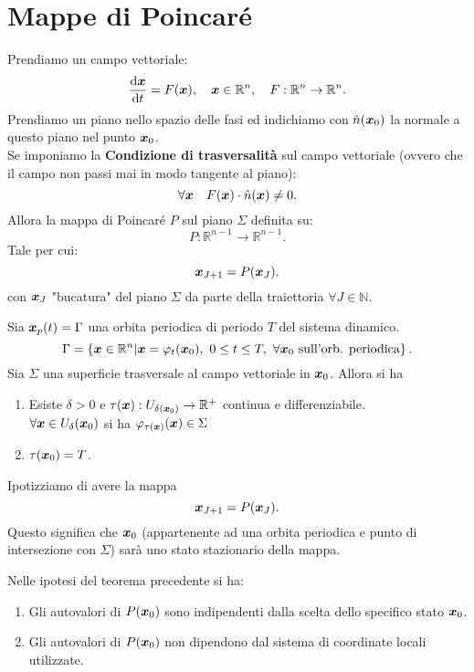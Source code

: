 \section{Mappe di Poincaré}%
Prendiamo un campo vettoriale:
\[
    \frac{\text{d} \boldsymbol{x}}{\text{d} t} = F(\boldsymbol{x}), \quad  \boldsymbol{x}\in \mathbb{R}^n, \quad  F:\mathbb{R}^n\to \mathbb{R}^n
.\] 
Prendiamo un piano nello spazio delle fasi ed indichiamo con $\hat{n}(\boldsymbol{x}_0)$ la normale a questo piano nel punto $\boldsymbol{x}_0$.\\
Se imponiamo la \textbf{Condizione di trasversalità} sul campo vettoriale (ovvero che il campo non passi mai in modo tangente al piano):
\[
    \forall \boldsymbol{x} \quad  F(\boldsymbol{x}) \cdot \hat{n}(\boldsymbol{x}) \neq 0
.\] 
Allora la mappa di Poincaré $P$ sul piano $\Sigma$ definita su:
\[
    P: \mathbb{R}^{n-1}\to \mathbb{R}^{n-1}
.\] 
Tale per cui:
\[
    \boldsymbol{x}_{J+1}= P(\boldsymbol{x}_J) 
.\] 
con $\boldsymbol{x}_J$ "bucatura" del piano $\Sigma$ da parte della traiettoria $\forall J \in \mathbb{N}$.
\begin{thm}[]
    Sia $\boldsymbol{x}_p(t) = \Gamma$ una orbita periodica di periodo $T$ del sistema dinamico. 
    \[
	\Gamma  = \left\{\boldsymbol{x}\in \mathbb{R}^n | \boldsymbol{x}= \varphi_t(\boldsymbol{x}_0), \ 0 \le t \le T, \ \forall \boldsymbol{x}_0 \text{ sull'orb. periodica}\right\}
    .\] 
    Sia $\Sigma$ una superficie trasversale al campo vettoriale in $\boldsymbol{x}_0$. Allora si ha
    \begin{enumerate}
	\item Esiste $\delta >0$ e $\tau (\boldsymbol{x}): U_{\delta (\boldsymbol{x}_0)}\to \mathbb{R}^+$ continua e differenziabile.\\
	    $\forall \boldsymbol{x}\in U_{\delta}(\boldsymbol{x}_0) $ si ha $\varphi_{\tau (\boldsymbol{x})}(\boldsymbol{x})\in \Sigma$ 
	\item $\tau(\boldsymbol{x}_0) = T$.
    \end{enumerate}
\end{thm}
\noindent
Ipotizziamo di avere la mappa 
\[
    \boldsymbol{x}_{J+1}= P(\boldsymbol{x}_J) 
.\] Questo significa che $\boldsymbol{x}_0$ (appartenente ad una orbita periodica e punto di intersezione con $\Sigma$) sarà uno stato stazionario della mappa.
\begin{thm}[]
    Nelle ipotesi del teorema precedente si ha:
    \begin{enumerate}
	\item Gli autovalori di $P(\boldsymbol{x}_0)$ sono indipendenti dalla scelta dello specifico stato $\boldsymbol{x}_0$.
	\item Gli autovalori di $P(\boldsymbol{x}_0)$ non dipendono dal sistema di coordinate locali utilizzate.
    \end{enumerate}
\end{thm}
